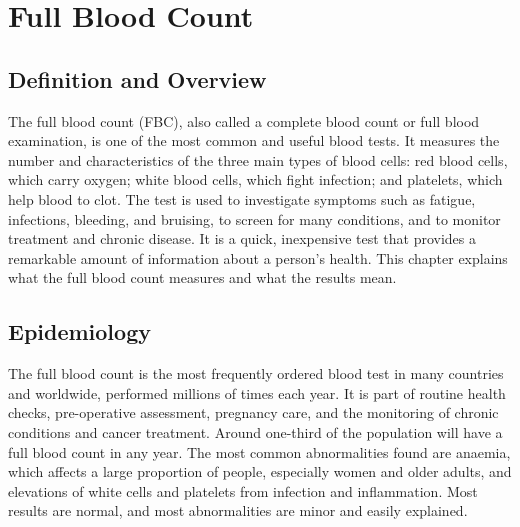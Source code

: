 \chapter{Full Blood Count}

\section*{Definition and Overview}
The full blood count (FBC), also called a complete blood count or full blood examination, is one of the most common and useful blood tests. It measures the number and characteristics of the three main types of blood cells: red blood cells, which carry oxygen; white blood cells, which fight infection; and platelets, which help blood to clot. The test is used to investigate symptoms such as fatigue, infections, bleeding, and bruising, to screen for many conditions, and to monitor treatment and chronic disease. It is a quick, inexpensive test that provides a remarkable amount of information about a person's health. This chapter explains what the full blood count measures and what the results mean.

\section*{Epidemiology}
The full blood count is the most frequently ordered blood test in many countries and worldwide, performed millions of times each year. It is part of routine health checks, pre-operative assessment, pregnancy care, and the monitoring of chronic conditions and cancer treatment. Around one-third of the population will have a full blood count in any year. The most common abnormalities found are anaemia, which affects a large proportion of people, especially women and older adults, and elevations of white cells and platelets from infection and inflammation. Most results are normal, and most abnormalities are minor and easily explained.

